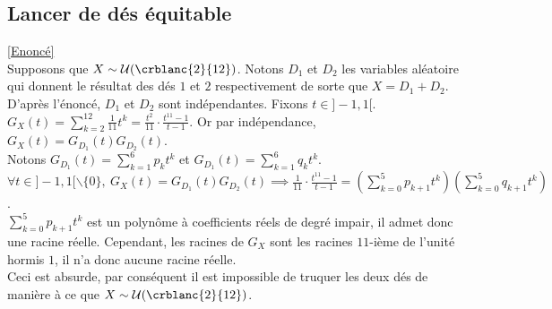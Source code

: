 \documentclass[8pt]{book}
\begin{document}
	\subsection{Lancer de dés équitable }
	\label{Lancer de dés équitable corrigé}
		\textcolor{blue}{\hyperref[Lancer de dés équitable]{[Enoncé]}}\\
	Supposons que $X\sim\mathcal U(\crblanc{2}{12})$. Notons $D_1$ et $D_2$ les variables aléatoire qui donnent le résultat des dés $1$ et $2$ respectivement de sorte que $X=D_1+D_2$. D'après l'énoncé, $D_1$ et $D_2$ sont indépendantes. Fixons $t\in]-1,1[$.\\
	$G_X(t)=\displaystyle\sum_{k=2}^{12}\frac{1}{11}t^k=\frac{t^2}{11}\cdot\frac{t^{11}-1}{t-1}$. Or par indépendance, $G_X(t)=G_{D_1}(t)G_{D_2}(t)$.\\
	Notons $G_{D_1}(t)=\displaystyle\sum_{k=1}^6p_kt^k$ et $G_{D_1}(t)=\displaystyle\sum_{k=1}^6q_kt^k$.\\
	$\forall t\in ]-1,1[\backslash\{0\},\ G_X(t)=G_{D_1}(t)G_{D_2}(t)\implies \displaystyle\frac{1}{11}\cdot \frac{t^{11}-1}{t-1}=\left(\sum_{k=0}^5p_{k+1}t^k\right)\left(\sum_{k=0}^5q_{k+1}t^k\right)$.\\
	$\displaystyle\sum_{k=0}^5p_{k+1}t^k$ est un polynôme à coefficients réels de degré impair, il admet donc une racine réelle. Cependant, les racines de $G_X$ sont les racines $11$-ième de l'unité hormis $1$, il n'a donc aucune racine réelle.\\
	Ceci est absurde, par conséquent il est impossible de truquer les deux dés de manière à ce que $X\sim\mathcal U(\crblanc{2}{12})$.
	
\end{document}
